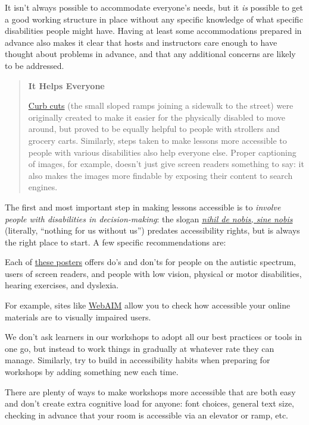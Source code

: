 It isn't always possible to accommodate everyone's needs, but it \emph{is}
possible to get a good working structure in place without any specific
knowledge of what specific disabilities people might have. Having at
least some accommodations prepared in advance also makes it clear that
hosts and instructors care enough to have thought about problems in
advance, and that any additional concerns are likely to be addressed.

\begin{quote}\setlength{\parindent}{0pt}
\textbf{It Helps Everyone}

\href{https://en.wikipedia.org/wiki/Curb_cut}{Curb cuts} (the small sloped ramps joining a sidewalk to
the street) were originally created to make it easier for the
physically disabled to move around, but proved to be equally helpful
to people with strollers and grocery carts. Similarly, steps taken
to make lessons more accessible to people with various disabilities
also help everyone else. Proper captioning of images, for example,
doesn't just give screen readers something to say: it also makes the
images more findable by exposing their content to search engines.
\end{quote}

The first and most important step in making lessons accessible is to
\emph{involve people with disabilities in decision-making}: the slogan
\emph{\href{https://en.wikipedia.org/wiki/Nothing_About_Us_Without_Us}{nihil de nobis, sine nobis}} (literally, ``nothing
for us without us'') predates accessibility rights, but is always the
right place to start. A few specific recommendations are:

\begin{description}
\tightlist
\item[Find out what you need to do.]
Each of \href{https://accessibility.blog.gov.uk/2016/09/02/dos-and-donts-on-designing-for-accessibility/}{these posters} offers do's and
don'ts for people on the autistic spectrum, users of screen readers,
and people with low vision, physical or motor disabilities, hearing
exercises, and dyslexia.
\item[Know how well you're doing.]
For example, sites like \href{http://webaim.org/}{WebAIM} allow you to check how
accessible your online materials are to visually impaired users.
\item[Don't do everything at once.]
We don't ask learners in our workshops to adopt all our best
practices or tools in one go, but instead to work things in
gradually at whatever rate they can manage. Similarly, try to build
in accessibility habits when preparing for workshops by adding
something new each time.
\item[Do the easy things first.]
There are plenty of ways to make workshops more accessible that are
both easy and don't create extra cognitive load for anyone: font
choices, general text size, checking in advance that your room is
accessible via an elevator or ramp, etc.
\end{description}


